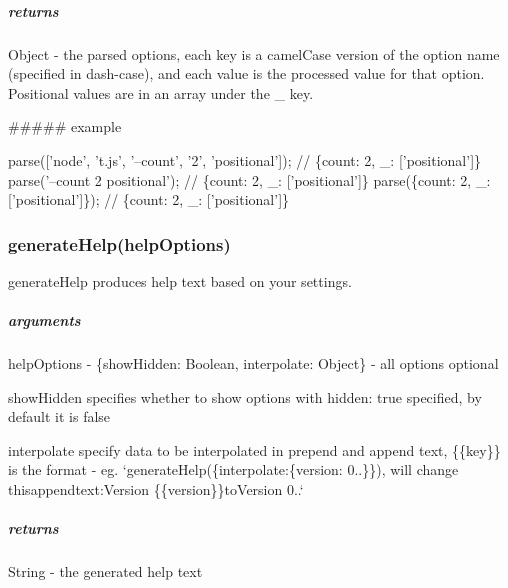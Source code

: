 \subparagraph*{returns}

{\ttfamily Object} -\/ the parsed options, each key is a camel\+Case version of the option name (specified in dash-\/case), and each value is the processed value for that option. Positional values are in an array under the {\ttfamily \+\_\+} key.

\#\#\#\#\# example 
\begin{DoxyCode}
parse([\textcolor{stringliteral}{'node'}, \textcolor{stringliteral}{'t.js'}, \textcolor{stringliteral}{'--count'}, \textcolor{charliteral}{'2'}, \textcolor{stringliteral}{'positional'}]); \textcolor{comment}{// \{count: 2, \_: ['positional']\}}
parse(\textcolor{stringliteral}{'--count 2 positional'});                         \textcolor{comment}{// \{count: 2, \_: ['positional']\}}
parse(\{count: 2, \_:[\textcolor{stringliteral}{'positional'}]\});                   \textcolor{comment}{// \{count: 2, \_: ['positional']\}}
\end{DoxyCode}


\subsubsection*{generate\+Help(help\+Options)}

{\ttfamily generate\+Help} produces help text based on your settings.

\subparagraph*{arguments}


\begin{DoxyItemize}
\item help\+Options -\/ {\ttfamily \{show\+Hidden\+: Boolean, interpolate\+: Object\}} -\/ all options optional
\begin{DoxyItemize}
\item {\ttfamily show\+Hidden} specifies whether to show options with {\ttfamily hidden\+: true} specified, by default it is {\ttfamily false}
\item {\ttfamily interpolate} specify data to be interpolated in {\ttfamily prepend} and {\ttfamily append} text, {\ttfamily \{\{key\}\}} is the format -\/ eg. `generate\+Help(\{interpolate\+:\{version\+: \textquotesingle{}0..\textquotesingle{}\}\}){\ttfamily , will change this}append{\ttfamily text\+:}Version \{\{version\}\}{\ttfamily to}Version 0..`
\end{DoxyItemize}
\end{DoxyItemize}

\subparagraph*{returns}

{\ttfamily String} -\/ the generated help text

